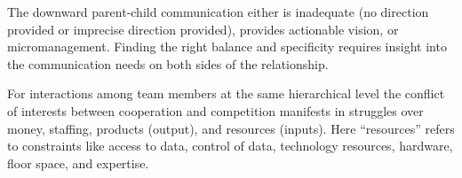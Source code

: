 The downward parent-child communication either is inadequate (no direction provided or imprecise direction provided), provides actionable vision, or micromanagement. Finding the right balance and specificity requires insight into the communication needs on both sides of the relationship. 

For interactions among team members at the same hierarchical level the conflict of interests between cooperation and competition manifests in struggles over money, staffing, products (output), and resources (inputs). Here ``resources''  refers to constraints like access to data, control of data, technology resources, hardware, floor space, and expertise. 


